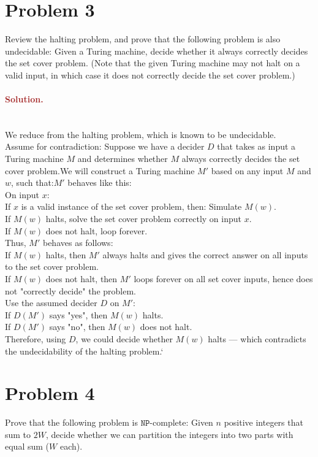 \section*{Problem 3}
Review the halting problem, and prove that the following problem is also undecidable: Given a Turing machine, decide whether it always correctly decides the set cover problem. (Note that the given Turing machine may not halt on a valid input, in which case it does not correctly decide the set cover problem.)

\paragraph{\textcolor{brown}{Solution.}} \: \\
We reduce from the halting problem, which is known to be undecidable.\\
Assume for contradiction: Suppose we have a decider \( D \) that takes as input a Turing machine \( M \) and determines whether \( M \) always correctly decides the set cover problem.We will construct a Turing machine \( M' \) based on any input \( M \) and \( w \), such that:\( M' \) behaves like this:\\
On input \( x \):\\
If \( x \) is a valid instance of the set cover problem, then: Simulate \( M(w) \).\\
If \( M(w) \) halts, solve the set cover problem correctly on input \( x \).\\
If \( M(w) \) does not halt, loop forever.\\
Thus, \( M' \) behaves as follows:\\
If \( M(w) \) halts, then \( M' \) always halts and gives the correct answer on all inputs to the set cover problem.\\
If \( M(w) \) does not halt, then \( M' \) loops forever on all set cover inputs, hence does not "correctly decide" the problem.\\
Use the assumed decider \( D \) on \( M' \):\\
If \( D(M') \) says "yes", then \( M(w) \) halts.\\
If \( D(M') \) says "no", then \( M(w) \) does not halt.\\
Therefore, using \( D \), we could decide whether \( M(w) \) halts — which contradicts the undecidability of the halting problem.`


\section*{Problem 4}
Prove that the following problem is $\mathtt{NP}$-complete: Given $n$ positive integers that sum to $2W$, decide whether we can partition the integers into two parts with equal sum ($W$ each).

